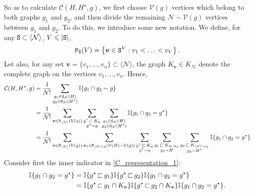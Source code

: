\documentclass[11pt,reqno]{amsart}
\numberwithin{equation}{section}
\newcommand{\abs}[1]{\left\lvert #1 \right\rvert}
\newcommand{\sprod}[1]{\langle#1\rangle}
\newcommand{\kb}[1]{\boldsymbol{#1}}
\newcommand{\vk}[1]{\kb{#1}}
\begin{document}
So as to calculate $\mathcal{C}({H},{H^{\star}},g)$, we first choose $\mathcal{V}(g)$ vertices which belong to both graphs $g_1$ and $g_2$, and then divide the remaining $\mathcal{N} - \mathcal{V}(g)$ vertices between $g_1$ and $g_2$. To do this, we introduce some new notation. We define, for any ${\tt S}\subset \sprod{\mathcal{N}}$, $V\leqslant \abs{{\tt S}}$,
\begin{align*}
    {\tt P}_{{\tt S}}(V) = \left\{\vk v\in {\tt S}^{V}: v_1<\ldots < v_{V}\right\}.
\end{align*}
Let also, for any set $\vk v = \{v_1,\ldots, v_n\}\subset \sprod{\mathcal{N}}$, the graph $K_{\vk v}\in K_{\mathcal{N}}$ denote the complete graph on the vertices $v_1,\ldots, v_n$.
Hence,
\begin{align}
   \mathcal{C}({H},{H^{\star}},g) &= \frac{1}{\mathcal{N}!}\sum_{\substack{g_1\in{\tt G}_{\mathcal{N}}({H}) \notag\\ g_2\in{\tt G}_{\mathcal{N}}({H^{\star}})}}\mathbb{I}\{g_1\cap g_2\sim g\}\\
   &= \frac{1}{\mathcal{N}!}\sum_{\vk v\in {\tt P}_{\sprod{\mathcal{N}}}(\mathcal{V}(g))}\sum_{\substack{g^{\star}{\,\sqsubset\,} K_{\vk v} \\ g^{\star}\sim g}}\sum_{\substack{g_1\in{\tt G}_{\mathcal{N}}({H}) \\ g_2\in{\tt G}_{\mathcal{N}}({H^{\star}})}}\mathbb{I}\{g_1\cap g_2= g^{\star}\}\notag\\
    &= \frac{1}{\mathcal{N}!}\sum_{\vk v\in {\tt P}_{\sprod{\mathcal{N}}}(\mathcal{V}(g))}\sum_{\vk v_1\in{\tt P}_{\sprod{N}\setminus\vk v}(\mathcal{V}({H})-\mathcal{V}(g))}\sum_{\substack{g^{\star}{\,\sqsubset\,} K_{\vk v} \\ g^{\star}\sim g}}\sum_{\substack{g_1{\,\sqsubset\,} K_{\vk v\cup \vk v_1} \\ g_1\sim {H}}}\sum_{\substack{g_2{\,\sqsubset\,} K_{\sprod{\mathcal{N}}\setminus \vk v_1} \\ g_2\sim {H^{\star}}}}\mathbb{I}\{g_1\cap g_2= g^{\star}\}\label{C_representation_1}
\end{align}
Consider first the inner indicator in \eqref{C_representation_1}:
\begin{align}
    \mathbb{I}\{g_1\cap g_2 = g^{\star}\} &= \mathbb{I}\{g^{\star}{\,\sqsubset\,} g_1\}\mathbb{I}\{g^{\star}{\,\sqsubset\,} g_2\}\mathbb{I}\{g_1\cap g_2 = g^{\star}\}\notag\\
    &= \mathbb{I}\{g^{\star}{\,\sqsubset\,} g_1\cap K_{\vk v}\}\mathbb{I}\{g^{\star}{\,\sqsubset\,} g_2\cap K_{\vk v}\}\mathbb{I}\{g_1\cap g_2 = g^{\star}\}.\label{indicator_1}
\end{align}
\end{document}
